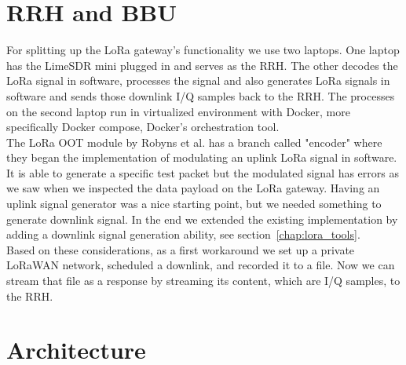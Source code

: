 \section{RRH and BBU}
For splitting up the LoRa gateway's functionality we use two laptops. 
One laptop has the LimeSDR mini plugged in and serves as the RRH. The other decodes the LoRa
signal in software, processes the signal and also generates LoRa signals in software and sends those downlink I/Q samples back to the RRH.
The processes on the second laptop run in virtualized environment with Docker, more specifically Docker compose, Docker's orchestration tool.
\\
The LoRa OOT module by Robyns et al. has a branch called "encoder" where they began the implementation of modulating an uplink LoRa signal in software.
It is able to generate a specific test packet but the modulated signal has errors as we saw when we inspected the data payload on the LoRa gateway.
Having an uplink signal generator was a nice starting point, but we needed something to generate downlink signal. In the end we extended the existing implementation
by adding a downlink signal generation ability, see section~\ref{chap:lora_tools}.
\\
Based on these considerations, as a first workaround we set up a private LoRaWAN network, scheduled a downlink, and recorded it to a file. Now we can stream that file as a response by streaming its content,
which are I/Q samples, to the RRH.


\section{Architecture}
